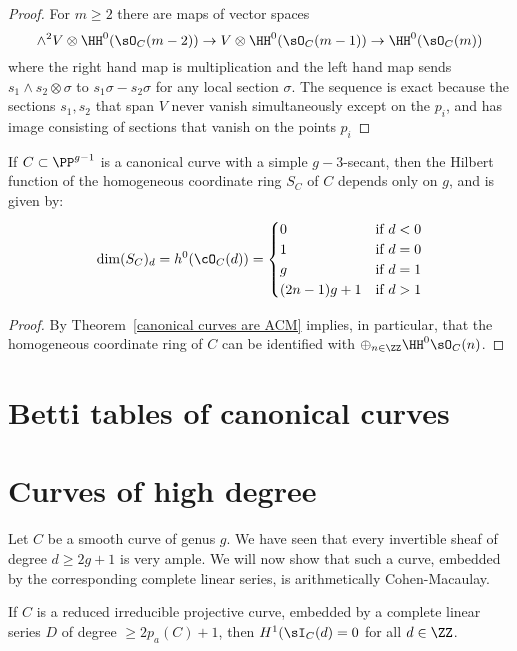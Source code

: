 \begin{proof}
For $m\geq 2$ there are maps of vector spaces
$$
\wedge^{2} V\otimes \HH^{0}(\sO_{C}(m-2)) \to V\otimes \HH^{0}(\sO_{C}(m-1)) 
\to \HH^{0}(\sO_{C}(m))
$$
where the right hand map is multiplication and the left hand map sends
$s_{1}\wedge s_{2}\otimes \sigma$ to $s_{1}\sigma-s_{2}\sigma$ for any local section $\sigma$.
The sequence is exact because the sections $s_{1},s_{2}$ that span $V$ never vanish simultaneously except on the $p_{i}$, and has image  consisting of sections that vanish on the points $p_{i}$
\end{proof}

\begin{corollary}\label{canonical hilbert function}
If $C\subset \PP^{g-1}$ is a canonical curve with a simple $g-3$-secant, then the Hilbert function of the homogeneous coordinate ring $S_{C}$ of  $C$ depends only on $g$, and is given by:
$$
\dim({S_{C}})_{d} = h^{0}(\cO_{C}(d)) = 
\begin{cases}
 0 &\mbox {if } d<0\\
 1 & \mbox {if }  d=0\\
 g & \mbox {if }  d=1\\
 (2n-1)g+1 & \mbox {if }  d>1\\
\end{cases}
$$
\end{corollary}
\begin{proof}
By Theorem~\ref{canonical curves are ACM} implies, in particular, that the homogeneous coordinate ring of $C$ can be identified with $\oplus_{n\in \ZZ}\HH^0\sO_C(n)$.  
\end{proof}

\section{Betti tables of canonical curves}

\section{Curves of high degree}
Let $C$ be a smooth curve of  genus $g$. We have seen that every invertible sheaf of degree $d \geq 2g+1$ is very ample. We will now show that
such a curve,  embedded by the corresponding complete linear series, is arithmetically Cohen-Macaulay.
\begin{theorem}\label{high degree ACM}
If $C$ is a reduced irreducible projective curve, embedded by a complete linear series $D$ of degree $\geq 2p_a(C)+1$, then
$H^1(\sI_C(d) = 0$ for all $d\in \ZZ$.
\end{theorem}

